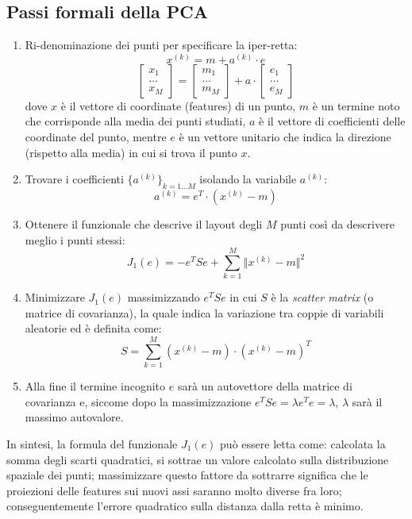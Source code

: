 \documentclass[a4paper,oneside,titlepage]{book}
\begin{document}
\subsection{Passi formali della PCA}
\begin{enumerate}
    \item Ri-denominazione dei punti per specificare la iper-retta:
    \[ x^{(k)} = m + a^{(k)} \cdot e \]
    \[ \left[ \substack{x_1 \\ \dots \\ x_M} \right] = \left[ \substack{m_1 \\ \dots \\ m_M} \right] + a \cdot \left[ \substack{e_1 \\ \dots \\ e_M} \right] \]
    dove $x$ è il vettore di coordinate (features) di un punto, $m$ è un termine noto che corrisponde alla media dei punti studiati, $a$ è il vettore di coefficienti delle coordinate del punto, mentre $e$ è un vettore unitario che indica la direzione (rispetto alla media) in cui si trova il punto $x$.
    
    \item Trovare i coefficienti $\{ a^{(k)} \}_{k=1 \dots M}$ isolando la variabile $a^{(k)}$:
    \[ a^{(k)} = e^T \cdot (x^{(k)} - m) \]
    
    \item Ottenere il funzionale che descrive il layout degli $M$ punti così da descrivere meglio i punti stessi:
    \[ J_1(e) = - e^T S e + \sum_{k=1}^M \Vert x^{(k)} - m \Vert^2 \]
    
    \item Minimizzare $J_1(e)$ massimizzando $e^T S e$ in cui $S$ è la \textit{scatter matrix} (o matrice di covarianza), la quale indica la variazione tra coppie di variabili aleatorie ed è definita come:
    \[ S = \sum_{k=1}^M (x^{(k)} - m) \cdot (x^{(k)} - m)^T \]
    
    \item Alla fine il termine incognito $e$ sarà un autovettore della matrice di covarianza e, siccome dopo la massimizzazione $e^T S e = \lambda e^T e = \lambda$, $\lambda$ sarà il massimo autovalore.
\end{enumerate}
In sintesi, la formula del funzionale $J_1(e)$ può essere letta come: calcolata la somma degli scarti quadratici, si sottrae un valore calcolato sulla distribuzione spaziale dei punti; massimizzare questo fattore da sottrarre significa che le proiezioni delle features sui nuovi assi saranno molto diverse fra loro; conseguentemente l'errore quadratico sulla distanza dalla retta è minimo.
\end{document}
